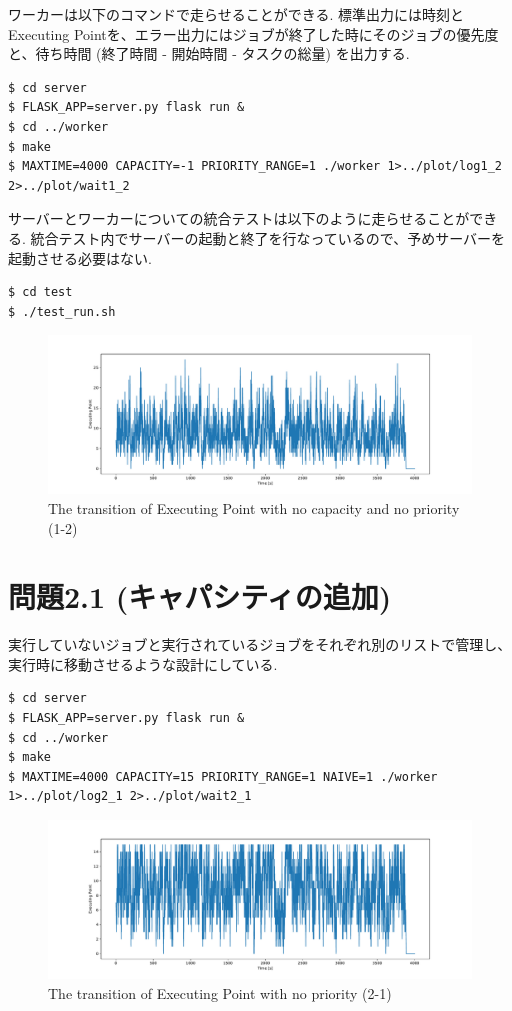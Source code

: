 ワーカーは以下のコマンドで走らせることができる.
標準出力には時刻とExecuting Pointを、エラー出力にはジョブが終了した時にそのジョブの優先度と、待ち時間 (終了時間 - 開始時間 - タスクの総量) を出力する.

\begin{lstlisting}[]
$ cd server
$ FLASK_APP=server.py flask run &
$ cd ../worker
$ make
$ MAXTIME=4000 CAPACITY=-1 PRIORITY_RANGE=1 ./worker 1>../plot/log1_2 2>../plot/wait1_2
\end{lstlisting}

サーバーとワーカーについての統合テストは以下のように走らせることができる.
統合テスト内でサーバーの起動と終了を行なっているので、予めサーバーを起動させる必要はない.

\begin{lstlisting}[]
$ cd test
$ ./test_run.sh
\end{lstlisting}

\begin{figure}[htbp]
  \centering
  \includegraphics[width=\linewidth]{imgs/log1_2.pdf}
  \caption{The transition of Executing Point with no capacity and no priority (1-2)}
  \label{fig:log1_2}
\end{figure}

\clearpage
\section*{問題2.1 (キャパシティの追加)}

実行していないジョブと実行されているジョブをそれぞれ別のリストで管理し、実行時に移動させるような設計にしている.

\begin{lstlisting}[]
$ cd server
$ FLASK_APP=server.py flask run &
$ cd ../worker
$ make
$ MAXTIME=4000 CAPACITY=15 PRIORITY_RANGE=1 NAIVE=1 ./worker 1>../plot/log2_1 2>../plot/wait2_1
\end{lstlisting}

\begin{figure}[htbp]
  \centering
  \includegraphics[width=\linewidth]{imgs/log2_1.pdf}
  \caption{The transition of Executing Point with no priority (2-1)}
  \label{fig:log2_1}
\end{figure}

